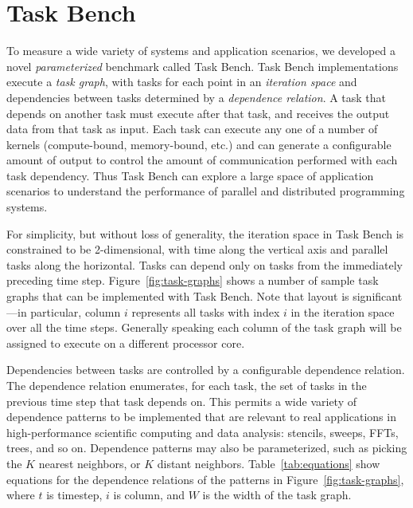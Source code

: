 \section{Task Bench}
\label{sec:task-bench}

To measure a wide variety of
systems and application scenarios, we developed a novel
\emph{parameterized} benchmark called Task Bench. Task Bench
implementations execute a \emph{task graph}, with tasks for each point
in an \emph{iteration space} and dependencies between tasks determined
by a \emph{dependence relation}. A task that depends on another task
must execute after that task, and receives the output data from that
task as input. Each task can execute any one of a
number of kernels (compute-bound, memory-bound, etc.) and can generate
a configurable amount of output to control the amount of communication
performed with each task dependency. Thus Task Bench can explore a large space of application scenarios to
understand the performance of parallel and
distributed programming systems.

For simplicity, but without loss of generality, the iteration space in
Task Bench is constrained to be 2-dimensional, with time along
the vertical axis and parallel tasks along the
horizontal. Tasks can depend only on tasks from the immediately
preceding time step. Figure~\ref{fig:task-graphs} shows a number of sample task
graphs that can be implemented with Task Bench. Note that layout is
significant---in particular, column $i$ represents all tasks
with index $i$ in the iteration space over all the time
steps. Generally speaking each column of the task graph will be
assigned to execute on a different processor core.

Dependencies between tasks are controlled by a configurable dependence
relation. The
dependence relation enumerates, for each task, the set of tasks in the
previous time step that task depends on. This permits a wide variety
of dependence patterns to be implemented that are relevant to real
applications in high-performance scientific computing and data analysis: stencils,
sweeps, FFTs, trees, and so on. Dependence patterns may also be
parameterized, such as picking the $K$ nearest neighbors, or $K$
distant neighbors. Table~\ref{tab:equations} show equations for the
dependence relations of the patterns in Figure~\ref{fig:task-graphs},
where $t$ is timestep, $i$ is column, and $W$ is the width of the task
graph.




